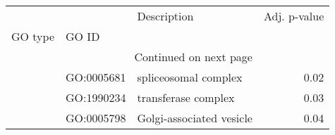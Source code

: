 \begin{longtable}{lllr}
\toprule
   &            &               Description &  Adj. p-value \\
GO type & GO ID &                           &               \\
\midrule
\endhead
\midrule
\multicolumn{3}{r}{{Continued on next page}} \\
\midrule
\endfoot

\bottomrule
\endlastfoot
\multirow{3}{*}{CC} & GO:0005681 &      spliceosomal complex &          0.02 \\
   & GO:1990234 &       transferase complex &          0.03 \\
   & GO:0005798 &  Golgi-associated vesicle &          0.04 \\
\end{longtable}
